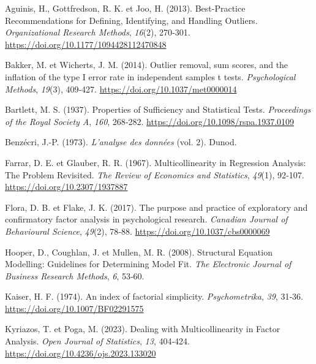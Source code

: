 \documentclass[
  french,
  11pt,
  a4paper,
]{article}
\newlength{\cslhangindent}
\newenvironment{CSLReferences}[2] %
 {\begin{list}{}{%
  \setlength{\itemindent}{0pt}
  \setlength{\leftmargin}{0pt}
  \setlength{\parsep}{0pt}
  \ifodd #1
   \setlength{\leftmargin}{\cslhangindent}
   \setlength{\itemindent}{-1\cslhangindent}
  \fi
  \setlength{\itemsep}{#2\baselineskip}}}
 {\end{list}}
\begin{document}
\protect{}\label{refs}
\begin{CSLReferences}{1}{0}
Aguinis, H., Gottfredson, R. K. et Joo, H. (2013). Best-Practice
Recommendations for Defining, Identifying, and Handling Outliers.
\emph{Organizational Research Methods}, \emph{16}(2), 270‑301.
\url{https://doi.org/10.1177/1094428112470848}

Bakker, M. et Wicherts, J. M. (2014). Outlier removal, sum scores, and
the inflation of the type I error rate in independent samples t tests.
\emph{Psychological Methods}, \emph{19}(3), 409‑427.
\url{https://doi.org/10.1037/met0000014}

Bartlett, M. S. (1937). Properties of Sufficiency and Statistical Tests.
\emph{Proceedings of the Royal Society A}, \emph{160}, 268‑282.
\url{https://doi.org/10.1098/rspa.1937.0109}

Benzécri, J.-P. (1973). \emph{L'analyse des donn{é}es} (vol. 2). Dunod.

Farrar, D. E. et Glauber, R. R. (1967). Multicollinearity in Regression
Analysis: The Problem Revisited. \emph{The Review of Economics and
Statistics}, \emph{49}(1), 92‑107. \url{https://doi.org/10.2307/1937887}

Flora, D. B. et Flake, J. K. (2017). The purpose and practice of
exploratory and confirmatory factor analysis in psychological research.
\emph{Canadian Journal of Behavioural Science}, \emph{49}(2), 78‑88.
\url{https://doi.org/10.1037/cbs0000069}

Hooper, D., Coughlan, J. et Mullen, M. R. (2008). Structural Equation
Modelling: Guidelines for Determining Model Fit. \emph{The Electronic
Journal of Business Research Methods}, \emph{6}, 53‑60.

Kaiser, H. F. (1974). An index of factorial simplicity.
\emph{Psychometrika}, \emph{39}, 31‑36.
\url{https://doi.org/10.1007/BF02291575}

Kyriazos, T. et Poga, M. (2023). Dealing with Multicollinearity in
Factor Analysis. \emph{Open Journal of Statistics}, \emph{13}, 404‑424.
\url{https://doi.org/10.4236/ojs.2023.133020}


\end{CSLReferences}
\end{document}
